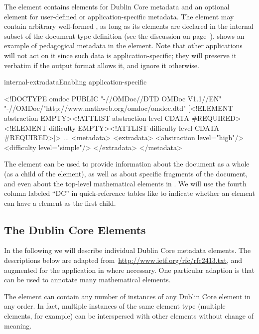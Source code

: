 The {} element contains elements for Dublin Core metadata and an
optional {} element for user-defined or application-specific
metadata. The {} element may contain arbitrary well-formed {\xml}, as
long as its elements are declared in the internal subset of the document type definition
(see the discussion on page~\pageref{page:internal-dtd}).  {}
shows an example of pedagogical metadata in the {} element. Note that
other {\omdoc} applications will not act on it since such data is application-specific;
they will preserve it verbatim if the output format allows it, and ignore it otherwise.
\begin{myfig}{internal-extradata}{Enabling application-specific {}}
  \footnotesize
\begin{boxedverbatim}
<!DOCTYPE omdoc PUBLIC "-//OMDoc//DTD OMDoc V1.1//EN" 
                       "-//OMDoc/"http://www.mathweb.org/omdoc/omdoc.dtd" 
  [<!ELEMENT abstraction EMPTY><!ATTLIST abstraction level CDATA #REQUIRED>
   <!ELEMENT difficulty EMPTY><!ATTLIST difficulty level CDATA #REQUIRED>]>
...
<metadata>
 <extradata>
  <abstraction level="high"/>
  <difficulty level="simple"/>
 </extradata>
</metadata>
\end{boxedverbatim}
\end{myfig}
The {\omdoc} {} element can be used to provide information about the
document as a whole (as a child of the {} element), as well as about
specific fragments of the document, and even about the top-level mathematical elements in
{\omdoc}. We will use the fourth column labeled ``DC'' in quick-reference tables like
{} to indicate whether an {\omdoc} element can have a
{} element as the first child.


\subsection{The Dublin Core Elements}\label{sec:dc-elements}

In the following we will describe individual Dublin Core metadata elements. The
descriptions below are adapted from~\url{http://www.ietf.org/rfc/rfc2413.txt}, and
augmented for the application in {\omdoc} where necessary. One particular adaption is that
{} can be used to annotate many mathematical elements.

The {\omdoc} {} element can contain any number of instances of any
Dublin Core element in any order. In fact, multiple instances of the same element type
(multiple {} elements, for example) can be interspersed with other
elements without change of meaning.

